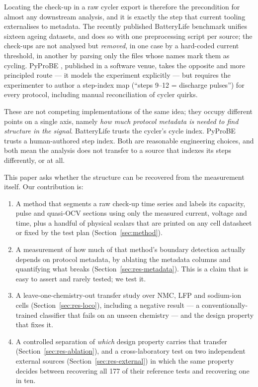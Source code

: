 \documentclass[preprint,3p,number]{elsarticle}
\begin{document}
Locating the check-up in a raw cycler export is therefore the precondition for
almost any downstream analysis, and it is exactly the step that current tooling
externalises to metadata. The recently published BatteryLife benchmark
\cite{batterylife} unifies sixteen ageing datasets, and does so with one
preprocessing script per source; the check-ups are not analysed but
\emph{removed}, in one case by a hard-coded current threshold, in another by
parsing only the files whose names mark them as cycling. PyProBE
\cite{pyprobe}, published in a software venue, takes the opposite and more
principled route --- it models the experiment explicitly --- but requires the
experimenter to author a step-index map (``steps 9--12 = discharge pulses'')
for every protocol, including manual reconciliation of cycler quirks.

These are not competing implementations of the same idea; they occupy different
points on a single axis, namely \emph{how much protocol metadata is needed to
find structure in the signal}. BatteryLife trusts the cycler's cycle index.
PyProBE trusts a human-authored step index. Both are reasonable engineering
choices, and both mean the analysis does not transfer to a source that indexes
its steps differently, or at all.

This paper asks whether the structure can be recovered from the measurement
itself. Our contribution is:

\begin{enumerate}
\item A method that segments a raw check-up time series and labels its capacity,
pulse and quasi-OCV sections using only the measured current, voltage and time,
plus a handful of physical scalars that are printed on any cell datasheet or
fixed by the test plan (Section~\ref{sec:method}).
\item A measurement of how much of that method's boundary detection actually
depends on protocol metadata, by ablating the metadata columns and quantifying
what breaks (Section~\ref{sec:res-metadata}). This is a claim that is easy to
assert and rarely tested; we test it.
\item A leave-one-chemistry-out transfer study over NMC, LFP and sodium-ion
cells (Section~\ref{sec:res-loco}), including a negative result --- a
conventionally-trained classifier that fails on an unseen chemistry --- and the
design property that fixes it.
\item A controlled separation of \emph{which} design property carries that
transfer (Section~\ref{sec:res-ablation}), and a cross-laboratory test on two
independent external sources (Section~\ref{sec:res-external}) in which the
same property decides between recovering all \num{177} of their reference
tests and recovering one in ten.
\end{enumerate}
\end{document}

